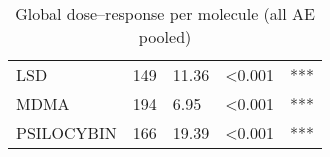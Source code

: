 \begin{table}[!h]
\centering
\caption{Global dose–response per molecule (all AE pooled)}
\centering
\begin{tabular}[t]{lrlll}
\toprule
LSD & 149 & 11.36 & <0.001 & ***\\
MDMA & 194 & 6.95 & <0.001 & ***\\
PSILOCYBIN & 166 & 19.39 & <0.001 & ***\\
\bottomrule
\end{tabular}
\end{table}
